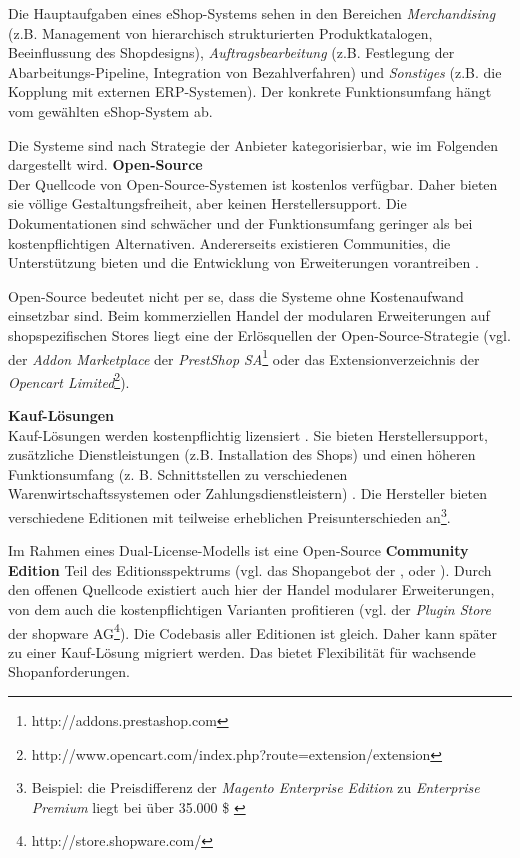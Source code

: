 \documentclass[11pt, a4paper, titlepage, listof=totoc, bibliography=totoc, index=totoc, twoside, openright, headings=normal, draft]{scrreprt}
\begin{document}
Die Hauptaufgaben eines eShop-Systems sehen \citet{boles00} in den Bereichen \emph{Merchandising} (z.B. Management von hierarchisch strukturierten Produktkatalogen, Beeinflussung des Shopdesigns), \emph{Auftragsbearbeitung} (z.B. Festlegung der Abarbeitungs-Pipeline, Integration von Bezahlverfahren) und \emph{Sonstiges} (z.B. die Kopplung mit externen ERP-Systemen). Der konkrete Funktionsumfang hängt vom gewählten eShop-System ab.

Die Systeme sind nach Strategie der Anbieter kategorisierbar, wie im Folgenden dargestellt wird.
\newpage
\textbf{Open-Source}\\
Der Quellcode von Open-Source-Systemen ist kostenlos verfügbar. Daher bieten sie völlige Gestaltungsfreiheit, aber keinen Herstellersupport. Die Dokumentationen sind schwächer und der Funktionsumfang geringer als bei kostenpflichtigen Alternativen. Andererseits existieren Communities, die Unterstützung bieten und die Entwicklung von Erweiterungen vorantreiben \citep{stahl15}.

Open-Source bedeutet nicht per se, dass die Systeme ohne Kostenaufwand einsetzbar sind. Beim kommerziellen Handel der modularen Erweiterungen auf shopspezifischen Stores liegt eine der Erlösquellen der Open-Source-Strategie (vgl. der \emph{Addon Marketplace} der \emph{PrestShop SA}\footnote{http://addons.prestashop.com} oder das Extensionverzeichnis der \emph{Opencart Limited}\footnote{http://www.opencart.com/index.php?route=extension/extension}).

\textbf{Kauf-Lösungen}\\
Kauf-Lösungen werden kostenpflichtig lizensiert \citep[z.B.][]{shopwarePricing}. Sie bieten Herstellersupport, zusätzliche Dienstleistungen (z.B. Installation des Shops) und einen höheren Funktionsumfang (z. B. Schnittstellen zu verschiedenen Warenwirtschaftssystemen oder Zahlungsdienstleistern) \citep{stahl15}. Die Hersteller bieten verschiedene Editionen mit teilweise erheblichen Preisunterschieden an\footnote{Beispiel: die Preisdifferenz der \emph{Magento Enterprise Edition} zu \emph{Enterprise Premium} liegt bei über 35.000 \$ \citep[vgl][]{fwpShop}}.

Im Rahmen eines Dual-License-Modells ist eine Open-Source \textbf{Community Edition} Teil des Editionsspektrums \citep{t3n14} (vgl. das Shopangebot der \citet{magentoShops}, \citet{shopwarePricing} oder \citet{oxidShops}). Durch den offenen Quellcode existiert auch hier der Handel modularer Erweiterungen, von dem auch die kostenpflichtigen Varianten profitieren (vgl. der \emph{Plugin Store} der shopware AG\footnote{http://store.shopware.com/}). Die Codebasis aller Editionen ist gleich. Daher kann später zu einer Kauf-Lösung migriert werden. Das bietet Flexibilität für wachsende Shopanforderungen.
\end{document}
